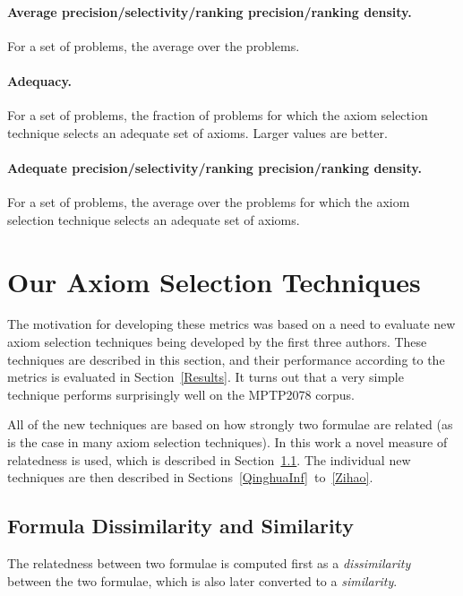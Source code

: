 \documentclass[EPiC]{easychair}
\begin{document}
\paragraph{Average precision/selectivity/ranking precision/ranking density.}
For a set of problems, the average over the problems.

\paragraph{Adequacy.}
For a set of problems, the fraction of problems for which the axiom 
selection technique selects an adequate set of axioms.
Larger values are better.

\paragraph{Adequate precision/selectivity/ranking precision/ranking density.}
For a set of problems, the average over the problems for which the axiom
selection technique selects an adequate set of axioms.

\section{Our Axiom Selection Techniques}
\label{Ours}

The motivation for developing these metrics was based on a need to evaluate
new axiom selection techniques being developed by the first three authors.
These techniques are described in this section, and their performance
according to the metrics is evaluated in Section~\ref{Results}.
It turns out that a very simple technique performs surprisingly well
on the MPTP2078 corpus.

All of the new techniques are based on how strongly two formulae are
related (as is the case in many axiom selection techniques).
In this work a novel measure of relatedness is used, which is described
in Section~\ref{QinghuaDistance}.
The individual new techniques are then described in 
Sections~\ref{QinghuaInf}~to~\ref{Zihao}.

\subsection{Formula Dissimilarity and Similarity}
\label{QinghuaDistance}

The relatedness between two formulae is computed first as a
\emph{dissimilarity} between the two formulae, which is also later converted
to a \emph{similarity}.
\end{document}
